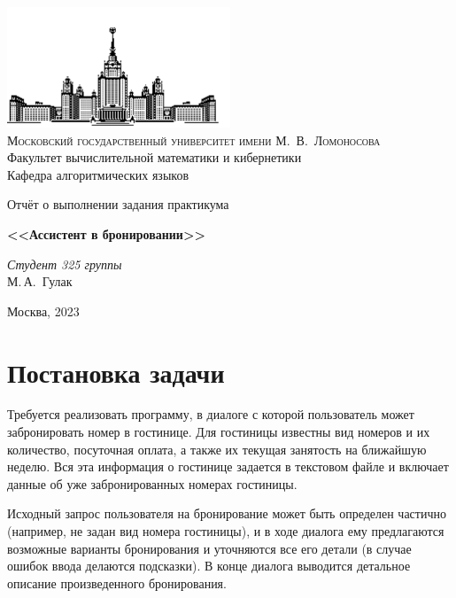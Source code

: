 \documentclass[oneside,final,14pt]{extarticle}
\begin{document}
\thispagestyle{empty}

\begin{center}
\vspace{-3cm}

\includegraphics[width=0.5\textwidth]{msu.pdf}\\
{\scshape Московский государственный университет имени М.~В.~Ломоносова}\\
Факультет вычислительной математики и кибернетики\\
Кафедра алгоритмических языков

\vfill

{\LARGE Отчёт о выполнении задания практикума}

\vspace{1cm}

    {\Huge\bfseries <<Ассистент в бронировании>>}
\end{center}

\vspace{1cm}

\begin{flushright}
  \large
    \textit{Студент 325 группы}\\
  М.\,А.~Гулак\\
\end{flushright}

\vfill

\begin{center}
Москва, 2023
\end{center}

\newpage
\section{Постановка задачи}

Требуется реализовать программу, в диалоге с которой пользователь может
забронировать номер в гостинице. Для гостиницы известны вид номеров
и их количество, посуточная оплата, а также их текущая занятость на ближайшую неделю.
Вся эта информация о гостинице задается в текстовом файле и включает данные об уже
забронированных номерах гостиницы.

Исходный запрос пользователя на бронирование может быть определен частично
(например, не задан вид номера гостиницы), и в ходе диалога ему предлагаются возможные варианты бронирования и
уточняются все его детали (в случае ошибок ввода делаются подсказки). В конце диалога
выводится детальное описание произведенного бронирования.
\end{document}
